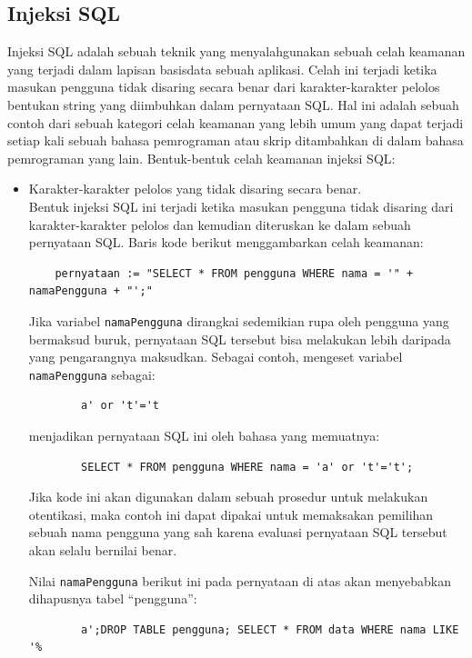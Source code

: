 \subsection{Injeksi SQL}
Injeksi SQL \cite{injeksi-sql} adalah sebuah teknik yang menyalahgunakan sebuah celah keamanan yang terjadi dalam lapisan basisdata sebuah aplikasi. Celah ini terjadi ketika masukan pengguna tidak disaring secara benar dari karakter-karakter pelolos bentukan string yang diimbuhkan dalam pernyataan SQL. Hal ini adalah sebuah contoh dari sebuah kategori celah keamanan yang lebih umum yang dapat terjadi setiap kali sebuah bahasa pemrograman atau skrip ditambahkan di dalam bahasa pemrograman yang lain. Bentuk-bentuk celah keamanan injeksi SQL:
\begin{itemize}
	\item Karakter-karakter pelolos yang tidak disaring secara benar.\\
	Bentuk injeksi SQL ini terjadi ketika masukan pengguna tidak disaring dari karakter-karakter pelolos dan kemudian diteruskan ke dalam sebuah pernyataan SQL. Baris kode berikut menggambarkan celah keamanan:
	\begin{lstlisting}
	pernyataan := "SELECT * FROM pengguna WHERE nama = '" + namaPengguna + "';"
\end{lstlisting}
	
	Jika variabel \verb!namaPengguna! dirangkai sedemikian rupa oleh pengguna yang bermaksud buruk, pernyataan SQL tersebut bisa melakukan lebih daripada yang pengarangnya maksudkan. Sebagai contoh, mengeset variabel \verb!namaPengguna! sebagai:
	\begin{lstlisting}
		a' or 't'='t
	\end{lstlisting}
	menjadikan pernyataan SQL ini oleh bahasa yang memuatnya:
	\begin{lstlisting}
		SELECT * FROM pengguna WHERE nama = 'a' or 't'='t';
	\end{lstlisting}
	Jika kode ini akan digunakan dalam sebuah prosedur untuk melakukan otentikasi, maka contoh ini dapat dipakai untuk memaksakan pemilihan sebuah nama pengguna yang sah karena evaluasi pernyataan SQL tersebut akan selalu bernilai benar.
	
	 Nilai \verb!namaPengguna! berikut ini pada pernyataan di atas akan menyebabkan dihapusnya tabel ``pengguna'':
	 
	\begin{lstlisting}
		a';DROP TABLE pengguna; SELECT * FROM data WHERE nama LIKE '%
	\end{lstlisting}
	

\end{itemize}
